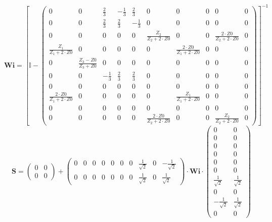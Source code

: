 \[ \mathbf{Wi} =  \left[ \mathbb{I}  - \left(\begin{smallmatrix} 0 & 0
& \frac{2}{3} & -\frac{1}{3} & \frac{2}{3} & 0 & 0 & 0 & 0 & 0 \\ 0 &
0 & \frac{2}{3} & \frac{2}{3} & -\frac{1}{3} & 0 & 0 & 0 & 0 & 0 \\ 0
& 0 & 0 & 0 & 0 & \frac{Z_2}{Z_2+2\cdot Z0} & 0 & 0 & \frac{2\cdot
Z0}{Z_2+2\cdot Z0} & 0 \\ \frac{Z_1}{Z_1+2\cdot Z0} & 0 & 0 & 0 & 0 &
0 & \frac{2\cdot Z0}{Z_1+2\cdot Z0} & 0 & 0 & 0 \\ 0 & \frac{ Z_3
-Z0}{ Z_3 +Z0} & 0 & 0 & 0 & 0 & 0 & 0 & 0 & 0 \\ 0 & 0 & -\frac{1}{3}
& \frac{2}{3} & \frac{2}{3} & 0 & 0 & 0 & 0 & 0 \\ 0 & 0 & 0 & 0 & 0 &
0 & 0 & 0 & 0 & 0 \\ \frac{2\cdot Z0}{Z_1+2\cdot Z0} & 0 & 0 & 0 & 0 &
0 & \frac{Z_1}{Z_1+2\cdot Z0} & 0 & 0 & 0 \\ 0 & 0 & 0 & 0 & 0 & 0 & 0
& 0 & 0 & 0 \\ 0 & 0 & 0 & 0 & 0 & \frac{2\cdot Z0}{Z_2+2\cdot Z0} & 0
& 0 & \frac{Z_2}{Z_2+2\cdot Z0} & 0 \end{smallmatrix}\right)
\right]^{-1}  \]
\[ \mathbf{S} = \left(\begin{smallmatrix} 0 & 0 \\ 0 & 0
\end{smallmatrix}\right) + \left(\begin{smallmatrix} 0 & 0 & 0 & 0 & 0
& 0 & 0 & \frac{1}{\sqrt{2}} & 0 & -\frac{1}{\sqrt{2}} \\ 0 & 0 & 0 &
0 & 0 & 0 & 0 & \frac{1}{\sqrt{2}} & 0 & \frac{1}{\sqrt{2}}
\end{smallmatrix}\right) \cdot \mathbf{Wi}
\cdot\left(\begin{smallmatrix} 0 & 0 \\ 0 & 0 \\ 0 & 0 \\ 0 & 0 \\ 0 &
0 \\ 0 & 0 \\ \frac{1}{\sqrt{2}} & \frac{1}{\sqrt{2}} \\ 0 & 0 \\
-\frac{1}{\sqrt{2}} & \frac{1}{\sqrt{2}} \\ 0 & 0
\end{smallmatrix}\right) \]
